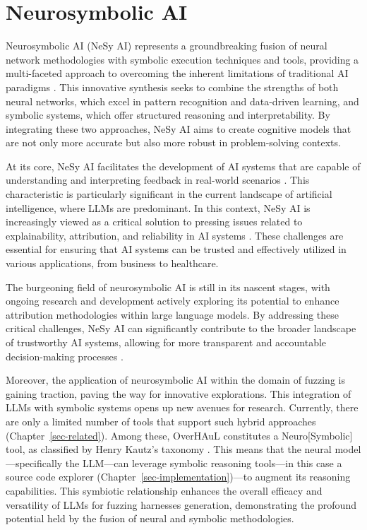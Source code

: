 \documentclass[
  a4paper,
]{scrreprt}
\theoremstyle{definition}
\theoremstyle{remark}
\begin{document}
\section{Neurosymbolic AI}\label{sec-nesy}

Neurosymbolic AI (NeSy AI) represents a groundbreaking fusion of neural
network methodologies with symbolic execution techniques and tools,
providing a multi-faceted approach to overcoming the inherent
limitations of traditional AI paradigms \autocite{sheth2023,garcez2020}.
This innovative synthesis seeks to combine the strengths of both neural
networks, which excel in pattern recognition and data-driven learning,
and symbolic systems, which offer structured reasoning and
interpretability. By integrating these two approaches, NeSy AI aims to
create cognitive models that are not only more accurate but also more
robust in problem-solving contexts.

At its core, NeSy AI facilitates the development of AI systems that are
capable of understanding and interpreting feedback in real-world
scenarios \autocite{ganguly2024}. This characteristic is particularly
significant in the current landscape of artificial intelligence, where
LLMs are predominant. In this context, NeSy AI is increasingly viewed as
a critical solution to pressing issues related to explainability,
attribution, and reliability in AI systems
\autocite{gaur2023,tilwani2024}. These challenges are essential for
ensuring that AI systems can be trusted and effectively utilized in
various applications, from business to healthcare.

The burgeoning field of neurosymbolic AI is still in its nascent stages,
with ongoing research and development actively exploring its potential
to enhance attribution methodologies within large language models. By
addressing these critical challenges, NeSy AI can significantly
contribute to the broader landscape of trustworthy AI systems, allowing
for more transparent and accountable decision-making processes
\autocite{sheth2023,gaur2023,tilwani2024}.

Moreover, the application of neurosymbolic AI within the domain of
fuzzing is gaining traction, paving the way for innovative explorations.
This integration of LLMs with symbolic systems opens up new avenues for
research. Currently, there are only a limited number of tools that
support such hybrid approaches (Chapter~\ref{sec-related}). Among these,
OverHAuL constitutes a Neuro{[}Symbolic{]} tool, as classified by Henry
Kautz's taxonomy \autocite{sarker2022,kautz2020}. This means that the
neural model---specifically the LLM---can leverage symbolic reasoning
tools---in this case a source code explorer
(Chapter~\ref{sec-implementation})---to augment its reasoning
capabilities. This symbiotic relationship enhances the overall efficacy
and versatility of LLMs for fuzzing harnesses generation, demonstrating
the profound potential held by the fusion of neural and symbolic
methodologies.
\end{document}
